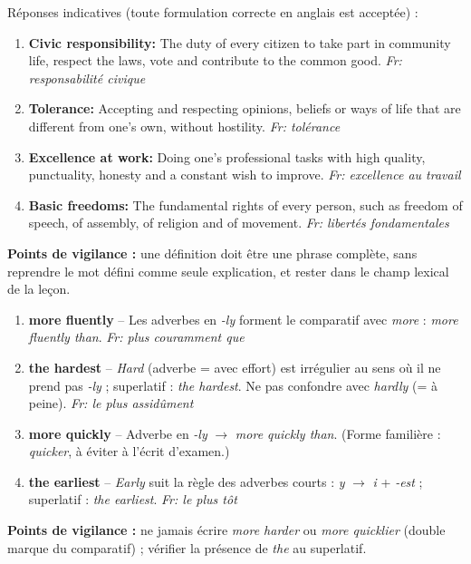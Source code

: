 \documentclass[11pt]{article}
\begin{document}
\begin{corrige}
Réponses indicatives (toute formulation correcte en anglais est acceptée) :
\begin{enumerate}
\item \textbf{Civic responsibility:} The duty of every citizen to take part in community life, respect the laws, vote and contribute to the common good. \emph{Fr: responsabilité civique}
\item \textbf{Tolerance:} Accepting and respecting opinions, beliefs or ways of life that are different from one's own, without hostility. \emph{Fr: tolérance}
\item \textbf{Excellence at work:} Doing one's professional tasks with high quality, punctuality, honesty and a constant wish to improve. \emph{Fr: excellence au travail}
\item \textbf{Basic freedoms:} The fundamental rights of every person, such as freedom of speech, of assembly, of religion and of movement. \emph{Fr: libertés fondamentales}
\end{enumerate}
\textbf{Points de vigilance :} une définition doit être une phrase complète, sans reprendre le mot défini comme seule explication, et rester dans le champ lexical de la leçon.
\end{corrige}

\begin{corrige}
\begin{enumerate}
\item \textbf{more fluently} -- Les adverbes en \emph{-ly} forment le comparatif avec \emph{more} : \emph{more fluently than}. \emph{Fr: plus couramment que}
\item \textbf{the hardest} -- \emph{Hard} (adverbe = avec effort) est irrégulier au sens où il ne prend pas \emph{-ly} ; superlatif : \emph{the hardest}. Ne pas confondre avec \emph{hardly} (= à peine). \emph{Fr: le plus assidûment}
\item \textbf{more quickly} -- Adverbe en \emph{-ly} $\rightarrow$ \emph{more quickly than}. (Forme familière : \emph{quicker}, à éviter à l'écrit d'examen.)
\item \textbf{the earliest} -- \emph{Early} suit la règle des adverbes courts : \emph{y} $\rightarrow$ \emph{i} + \emph{-est} ; superlatif : \emph{the earliest}. \emph{Fr: le plus tôt}
\end{enumerate}
\textbf{Points de vigilance :} ne jamais écrire \emph{more harder} ou \emph{more quicklier} (double marque du comparatif) ; vérifier la présence de \emph{the} au superlatif.
\end{corrige}
\end{document}
